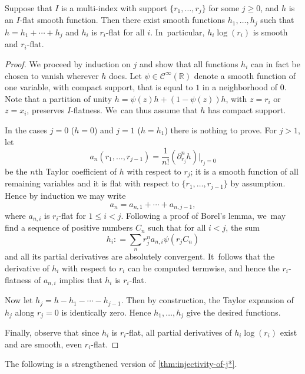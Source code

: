 \documentclass[10pt]{amsart}
\theoremstyle{definition}
\theoremstyle{remark}
\newcommand{\RR}{\mathbb{R}}
\renewcommand{\le}{\leqslant}
\renewcommand{\ge}{\geqslant}
\newcommand{\defas}{\mathrel{\mathop:}=}
\newcommand{\Cinf}[1]{\mathscr{C}^{\infty}_{#1}}
\newcommand{\cvf}[1]{\partial_{#1}}
\begin{document}
\begin{lemma}
Suppose that $I$ is a multi-index with support $\{r_1,\ldots,r_j\}$ for some $j \ge 0$, and $h$ is an $I$\nobreakdash-flat smooth function. Then there exist smooth functions $h_1,\ldots,h_j$ such that $h=h_1+\cdots + h_j$ and $h_i$ is $r_i$-flat for all $i$. In~particular, $h_i \log(r_i)$ is smooth and $r_i$-flat.
\end{lemma}

\begin{proof}
We proceed by induction on $j$ and show that all functions $h_i$ can in fact be chosen to vanish wherever $h$ does. Let $\psi\in\Cinf{}(\RR)$ denote a smooth function of one variable, with compact support, that is equal to $1$ in a neighborhood of $0$. Note that a partition of unity $h=\psi(z) h+(1-\psi(z)) h$, with $z=r_i$ or $z=x_i$, preserves $I$\nobreakdash-flatness. We~can thus assume that $h$ has compact support.

In the cases $j=0$ ($h=0$) and $j=1$ ($h=h_1$) there is nothing to prove. For $j>1$, let
\begin{equation*}
a_n(r_1,\ldots,r_{j-1}) = \frac{1}{n!}(\cvf{r_j}^n h) \big|_{r_j=0}
\end{equation*}
be the $n$th Taylor coefficient of $h$ with respect to $r_j$; it is a smooth function of all remaining variables and it is flat with respect to $\{r_1,\ldots,r_{j-1}\}$ by assumption. Hence by induction we may write
\[
a_n = a_{n,1} + \cdots + a_{n,j-1},
\]
where $a_{n,i}$ is $r_i$-flat for $1 \le i < j$. Following a proof of Borel's lemma, we~may find a sequence of positive numbers $C_n$ such that for all $i<j$, the sum
\begin{equation*}
h_i \defas \sum_{n} r_j^n a_{n,i} \psi(r_jC_n)
\end{equation*}
and all its partial derivatives are absolutely convergent. It~follows that the derivative of $h_i$ with respect to $r_i$ can be computed termwise, and hence the $r_i$-flatness of $a_{n,i}$ implies that $h_i$ is $r_i$-flat.

Now let $h_j = h - h_1 - \cdots - h_{j-1}$. Then by construction, the Taylor expansion of~$h_j$ along $r_j=0$ is identically zero. Hence $h_1,\ldots,h_j$ give the desired functions.

Finally, observe that since $h_i$ is $r_i$-flat, all partial derivatives of $h_i \log(r_i)$ exist and are smooth, even $r_i$-flat.
\end{proof}

The following is a strengthened version of \autoref{thm:injectivity-of-j*}.
\end{document}
